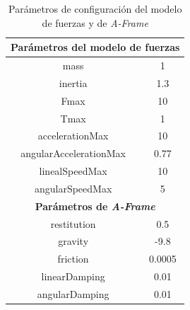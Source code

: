 \begin{table}[h!]
\centering
\begin{tabular}{|c|c|}
\hline
\multicolumn{2}{|c|}{\textbf{Parámetros del modelo de fuerzas}}                \\ \hline
mass                                           & 1                             \\ \hline
inertia                                        & 1.3                           \\ \hline
Fmax                                           & 10                            \\ \hline
Tmax                                           & 1                             \\ \hline
accelerationMax                                & 10                            \\ \hline
angularAccelerationMax                         & 0.77                          \\ \hline
linealSpeedMax                                 & 10                            \\ \hline
angularSpeedMax                                & 5                             \\ \hline
\multicolumn{2}{|c|}{\textbf{Parámetros de \textit{A-Frame}}} \\ \hline
restitution                                    & 0.5                           \\ \hline
gravity                                        & -9.8                          \\ \hline
friction                                       &  0.0005                       \\ \hline
linearDamping                                  & 0.01                         \\ \hline
angularDamping                                 & 0.01                         \\ \hline
\end{tabular}
\caption{Parámetros de configuración del modelo de fuerzas y de \textit{A-Frame}}
\label{tabla:param_ej4}
\end{table}

